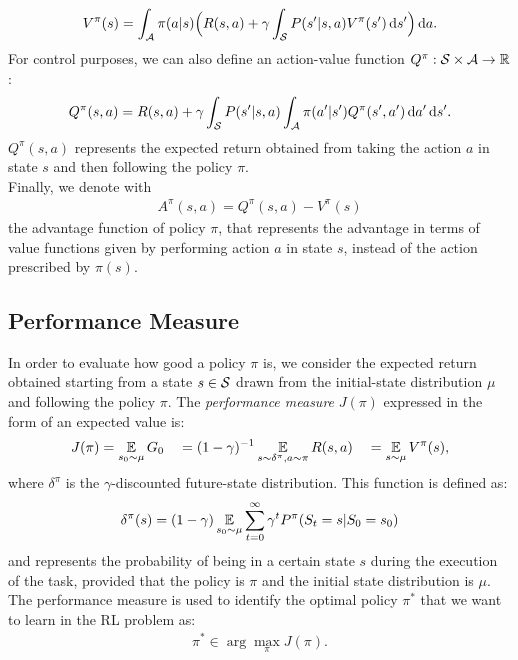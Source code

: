 \begin{align} V^{\pi}(s) = \int_{\mathcal{A}} \pi(a|s) \Big(R(s,a) + \gamma \int_{\mathcal{S}}P(s'|s,a)V^{\pi}(s')\,\mathrm{d} s' \Big) \,\mathrm{d} a.\end{align}
For control purposes, we can also define an action-value function $Q^{\pi}: \mathcal{S} \times \mathcal{A} \rightarrow \mathbb{R}$: \begin{align} Q^{\pi}(s,a) = R(s,a) + \gamma \int_{\mathcal{S}} P(s'|s,a) \int_{\mathcal{A}} \pi(a'|s') Q^{\pi}(s',a') \,\mathrm{d} a' \,\mathrm{d} s'.\end{align}
$Q^{\pi}(s,a)$ represents the expected return obtained from taking the action $a$ in state $s$ and then following the policy $\pi$. \\
\newline
Finally, we denote with
\begin{align} A^{\pi}(s,a) = Q^{\pi}(s,a) - V^{\pi}(s) \end{align}
the advantage function of policy $\pi$, that represents the advantage in terms of value functions given by performing action $a$ in state $s$, instead of the action prescribed by $\pi(s)$.

\subsection{Performance Measure}
In order to evaluate how good a policy $\pi$ is, we consider the expected return obtained starting from a state $s \in \mathcal{S}$ drawn from the initial-state distribution $\mu$ and following the policy $\pi$. The \emph{performance measure} $J(\pi)$ expressed in the form of an expected value is:
\begin{align} {J(\pi) = \operatorname*{\mathbb{E}}_{s_0\sim\mu}{G_0} \quad = (1 - \gamma)^{-1}\operatorname*{\mathbb{E}}_{s\sim\delta^{\pi}, a \sim \pi}R(s,a)} \quad = \operatorname*{\mathbb{E}}_{s\sim\mu}V^{\pi}(s), \end{align}
where $\delta^{\pi}$ is the $\gamma$-discounted future-state distribution. This function is defined as:
\begin{align} \delta^{\pi}(s) = (1 - \gamma)\operatorname*{\mathbb{E}}_{s_{0}\sim\mu}\sum_{t=0}^{\infty}\gamma^t P^{\pi}(S_t = s|S_0=s_0) \end{align}
and represents the probability of being in a certain state $s$ during the execution of the task, provided that the policy is $\pi$ and the initial state distribution is $\mu$.\\
\newline
The performance measure is used to identify the optimal policy $\pi^{*}$ that we want to learn in the \ac{RL} problem as:
\begin{align} \pi^{*} \in \arg \max_{\pi} J(\pi). \end{align}

